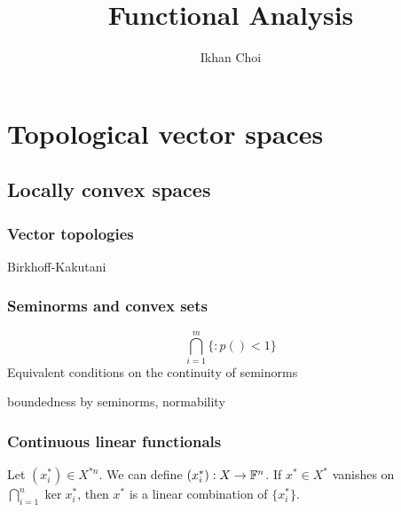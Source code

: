 \documentclass{../../large}
\begin{document}
\title{Functional Analysis}
\author{Ikhan Choi}
\maketitle
\tableofcontents

\part{Topological vector spaces}


\chapter{Locally convex spaces}
\section{Vector topologies}

\begin{prb}
\end{prb}
\begin{prb}[Metrizability]
Birkhoff-Kakutani
\end{prb}
\begin{prb}
\end{prb}




\section{Seminorms and convex sets}
\begin{prb}[Seminorms]
\[\bigcap_{i=1}^m\{:p()<1\}\]
Equivalent conditions on the continuity of seminorms
\end{prb}
\begin{pf}
\end{pf}
boundedness by seminorms, normability

\section{Continuous linear functionals}
\begin{prb}
Let $(x_i^*)\in X^{*n}$.
We can define $(x_i^*):X\to\mathbb{F}^n$.
If $x^*\in X^*$ vanishes on $\bigcap_{i=1}^n\ker x_i^*$, then $x^*$ is a linear combination of $\{x_i^*\}$.
\end{prb}
\end{document}
